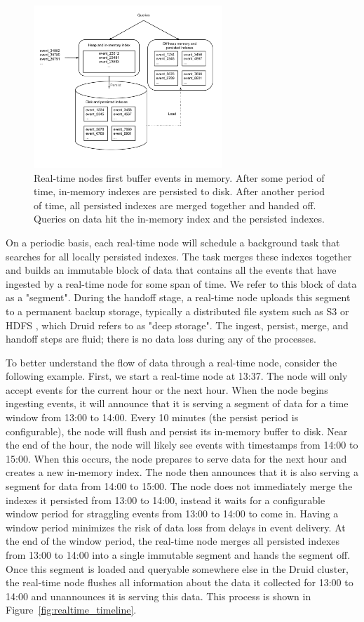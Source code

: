 \documentclass{acm_proc_article-sp}
\begin{document}
\begin{figure} 
\centering 
\includegraphics[width = 2.8in]{realtime_flow}
\caption{Real-time nodes first buffer events in memory. After some period of
time, in-memory indexes are persisted to disk. After another period of time,
all persisted indexes are merged together and handed off. Queries on data hit
the in-memory index and the persisted indexes.}
\label{fig:realtime_flow}
\end{figure}

On a periodic basis, each real-time node will schedule a background task that
searches for all locally persisted indexes. The task merges these indexes
together and builds an immutable block of data that contains all the events
that have ingested by a real-time node for some span of time. We refer to this
block of data as a "segment". During the handoff stage, a real-time node
uploads this segment to a permanent backup storage, typically a distributed
file system such as S3 \cite{decandia2007dynamo} or HDFS
\cite{shvachko2010hadoop}, which Druid refers to as "deep storage". The ingest,
persist, merge, and handoff steps are fluid; there is no data loss during any
of the processes.

To better understand the flow of data through a real-time node, consider the
following example. First, we start a real-time node at 13:37. The node will
only accept events for the current hour or the next hour. When the node begins
ingesting events, it will announce that it is serving a segment of data for a
time window from 13:00 to 14:00.  Every 10 minutes (the persist period is
configurable), the node will flush and persist its in-memory buffer to disk.
Near the end of the hour, the node will likely see events with timestamps from
14:00 to 15:00. When this occurs, the node prepares to serve data for the next
hour and creates a new in-memory index. The node then announces that it is also
serving a segment for data from 14:00 to 15:00.  The node does not immediately
merge the indexes it persisted from 13:00 to 14:00, instead it waits for a
configurable window period for straggling events from 13:00 to 14:00 to come
in. Having a window period minimizes the risk of data loss from delays in event
delivery. At the end of the window period, the real-time node merges all
persisted indexes from 13:00 to 14:00 into a single immutable segment and hands
the segment off.  Once this segment is loaded and queryable somewhere else in
the Druid cluster, the real-time node flushes all information about the data it
collected for 13:00 to 14:00 and unannounces it is serving this data. This
process is shown in Figure~\ref{fig:realtime_timeline}. 
\end{document}
